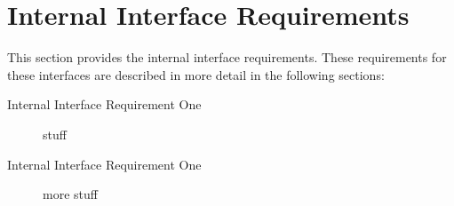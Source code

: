 \KNEADSECTIONNEWPAGE
\section{Internal Interface Requirements}
\label{lab:sec_InternalInterfaceRequirements}
% 


This section provides the internal interface requirements.
These requirements for these interfaces are described in more detail in the following sections:
\begin{description}
	\item[Internal Interface Requirement One] stuff%
	\item[Internal Interface Requirement One] more stuff%
\end{description}


